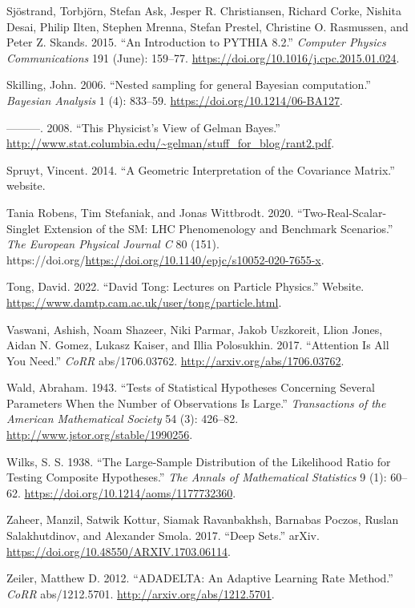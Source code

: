 \documentclass[
  11pt,
  numbers=noendperiod]{book}
\newlength{\cslhangindent}
\newlength{\cslentryspacingunit} %
\newenvironment{CSLReferences}[2] %
 {%
  \setlength{\parindent}{0pt}
  \ifodd #1
  \let\oldpar\par
  \def\par{\hangindent=\cslhangindent\oldpar}
  \fi
  \setlength{\parskip}{#2\cslentryspacingunit}
 }%
 {}
\begin{document}
\begin{CSLReferences}{1}{0}
\leavevmode{}%
Sjöstrand, Torbjörn, Stefan Ask, Jesper R. Christiansen, Richard Corke,
Nishita Desai, Philip Ilten, Stephen Mrenna, Stefan Prestel, Christine
O. Rasmussen, and Peter Z. Skands. 2015. {``An Introduction to {PYTHIA}
8.2.''} \emph{Computer Physics Communications} 191 (June): 159--77.
\url{https://doi.org/10.1016/j.cpc.2015.01.024}.

\leavevmode{}%
Skilling, John. 2006. {``{Nested sampling for general Bayesian
computation}.''} \emph{Bayesian Analysis} 1 (4): 833--59.
\url{https://doi.org/10.1214/06-BA127}.

\leavevmode{}%
---------. 2008. {``This Physicist's View of Gelman Bayes.''}
\url{http://www.stat.columbia.edu/~gelman/stuff_for_blog/rant2.pdf}.

\leavevmode{}%
Spruyt, Vincent. 2014. {``A Geometric Interpretation of the Covariance
Matrix.''} website.

\leavevmode{}%
Tania Robens, Tim Stefaniak, and Jonas Wittbrodt. 2020.
{``Two-Real-Scalar-Singlet Extension of the SM: LHC Phenomenology and
Benchmark Scenarios.''} \emph{The European Physical Journal C} 80 (151).
https://doi.org/\url{https://doi.org/10.1140/epjc/s10052-020-7655-x}.

\leavevmode{}%
Tong, David. 2022. {``David Tong: Lectures on Particle Physics.''}
Website. \url{https://www.damtp.cam.ac.uk/user/tong/particle.html}.

\leavevmode{}%
Vaswani, Ashish, Noam Shazeer, Niki Parmar, Jakob Uszkoreit, Llion
Jones, Aidan N. Gomez, Lukasz Kaiser, and Illia Polosukhin. 2017.
{``Attention Is All You Need.''} \emph{CoRR} abs/1706.03762.
\url{http://arxiv.org/abs/1706.03762}.

\leavevmode{}%
Wald, Abraham. 1943. {``Tests of Statistical Hypotheses Concerning
Several Parameters When the Number of Observations Is Large.''}
\emph{Transactions of the American Mathematical Society} 54 (3):
426--82. \url{http://www.jstor.org/stable/1990256}.

\leavevmode{}%
Wilks, S. S. 1938. {``{The Large-Sample Distribution of the Likelihood
Ratio for Testing Composite Hypotheses}.''} \emph{The Annals of
Mathematical Statistics} 9 (1): 60--62.
\url{https://doi.org/10.1214/aoms/1177732360}.

\leavevmode{}%
Zaheer, Manzil, Satwik Kottur, Siamak Ravanbakhsh, Barnabas Poczos,
Ruslan Salakhutdinov, and Alexander Smola. 2017. {``Deep Sets.''} arXiv.
\url{https://doi.org/10.48550/ARXIV.1703.06114}.

\leavevmode{}%
Zeiler, Matthew D. 2012. {``{ADADELTA:} An Adaptive Learning Rate
Method.''} \emph{CoRR} abs/1212.5701.
\url{http://arxiv.org/abs/1212.5701}.

\end{CSLReferences}
\end{document}
